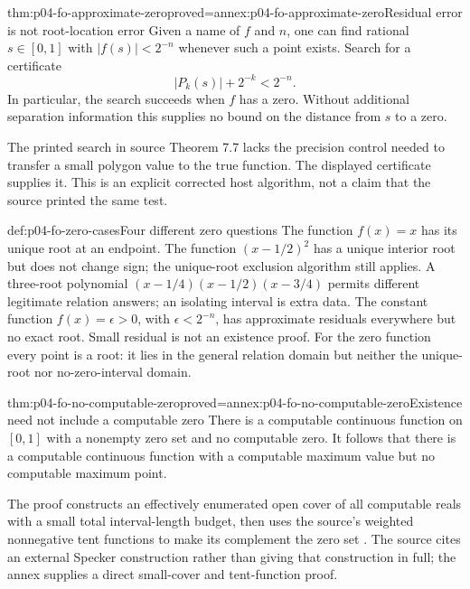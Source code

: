 \begin{hbtheorem}{thm:p04-fo-approximate-zero}{proved=annex:p04-fo-approximate-zero}{Residual error is not root-location error}
Given a name of \(f\) and \(n\), one can find rational
\(s\in[0,1]\) with \(|f(s)|<2^{-n}\) whenever such a
point exists. Search for a certificate
\[
 |P_k(s)|+2^{-k}<2^{-n}.
\]
In particular, the search succeeds when \(f\) has a zero.
Without additional separation information this supplies
no bound on the distance from \(s\) to a zero.
\end{hbtheorem}

The printed search in source Theorem 7.7 lacks the precision
control needed to transfer a small polygon value to the
true function. The displayed certificate supplies it.
This is an explicit corrected host algorithm, not a claim
that the source printed the same test.

\begin{hbexample}{def:p04-fo-zero-cases}{Four different zero questions}
The function \(f(x)=x\) has its unique root at an endpoint.
The function \((x-1/2)^2\) has a unique interior root but
does not change sign; the unique-root exclusion algorithm
still applies. A three-root polynomial
\((x-1/4)(x-1/2)(x-3/4)\) permits different legitimate
relation answers; an isolating interval is extra data.
The constant function \(f(x)=\epsilon>0\), with
\(\epsilon<2^{-n}\), has approximate residuals everywhere
but no exact root. Small residual is not an existence proof.
For the zero function every point is a root: it lies in the
general relation domain but neither the unique-root nor
no-zero-interval domain.
\end{hbexample}

\begin{hbtheorem}{thm:p04-fo-no-computable-zero}{proved=annex:p04-fo-no-computable-zero}{Existence need not include a computable zero}
There is a computable continuous function on \([0,1]\)
with a nonempty zero set and no computable zero.
It follows that there is a computable continuous function
with a computable maximum value but no computable maximum
point.
\end{hbtheorem}

The proof constructs an effectively enumerated open cover
of all computable reals with a small total interval-length
budget, then uses the source's weighted nonnegative tent
functions to make its complement the zero set
\cite[Theorem 7.1 and following cited boundary]{Weihrauch1995IntroductionRS}.
The source cites an external Specker construction rather
than giving that construction in full; the annex supplies
a direct small-cover and tent-function proof.

